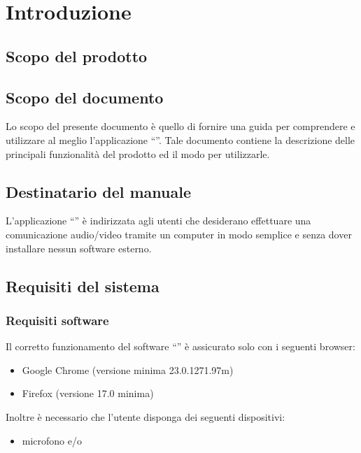 


\setcounter{page}{1}
\pagestyle{normal}

\section{Introduzione}
\subsection{Scopo del prodotto}
\purpose

\subsection{Scopo del documento}
Lo scopo del presente documento è quello di fornire una guida per comprendere e utilizzare al meglio l'applicazione ``\caName''.
Tale documento contiene la descrizione delle principali funzionalità del prodotto ed il modo
per utilizzarle.


\subsection{Destinatario del manuale}
L'applicazione  ``\caName'' è indirizzata agli utenti che desiderano effettuare una comunicazione audio/video tramite un computer in modo semplice  e senza dover installare nessun software esterno.  

\subsection{Requisiti del sistema}
\subsubsection{Requisiti software}
Il corretto funzionamento del software  ``\caName'' è assicurato solo con i seguenti browser:
\begin{itemize}
  \item Google Chrome (versione minima 23.0.1271.97m)
  \item Firefox (versione 17.0 minima)
\end{itemize}

Inoltre è necessario che l'utente disponga dei seguenti dispositivi:
\begin{itemize}
  \item microfono e/o  
 \end{itemize}
 
